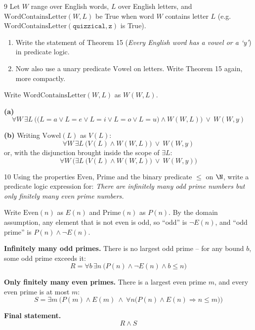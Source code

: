 \begin{exercise}{9}
    Let $W$ range over English words, $L$ over English letters, and
    $\mathrm{WordContainsLetter}(W,L)$ be True when word $W$ contains letter $L$
    (e.g.\ $\mathrm{WordContainsLetter}(\mathtt{quizzical},\mathtt z)$ is True).
    \begin{enumerate}[label=(\alph*)]
        \item Write the statement of Theorem 15 (\emph{Every English word has a
              vowel or a `y'}) in predicate logic.
        \item Now also use a unary predicate $\mathrm{Vowel}$ on letters. Write
              Theorem 15 again, more compactly.
    \end{enumerate}
\end{exercise}
\begin{solbox}

\begin{solution}
Write $\text{WordContainsLetter}(W,L)$ as $W(W,L)$.

\medskip
\noindent\textbf{(a)}
\[
\forall W\,\exists L\ \Big(\big(L=a\vee L=e\vee L=i\vee L=o\vee L=u\big)\wedge W(W,L)\Big)\ \vee\ W(W,y)
\]

\medskip
\noindent\textbf{(b)} Writing $\text{Vowel}(L)$ as $V(L)$:
\[
\forall W\,\exists L\ \Big(V(L)\wedge W(W,L)\Big)\ \vee\ W(W,y)
\]
or, with the disjunction brought inside the scope of $\exists L$:
\[
\forall W\ \Big(\exists L\ \big(V(L)\wedge W(W,L)\big)\ \vee\ W(W,y)\Big)
\]
\end{solution}
\end{solbox}

\begin{exercise}{10}
    Using the properties $\mathrm{Even}$, $\mathrm{Prime}$ and the binary
    predicate $\le$ on $\N$, write a predicate logic expression for:
    \emph{There are infinitely many odd prime numbers but only finitely many even
    prime numbers.}
\end{exercise}
\begin{solbox}

\begin{solution}
Write $\text{Even}(n)$ as $E(n)$ and $\text{Prime}(n)$ as $P(n)$. By
the domain assumption, any element that is not even is odd, so
``odd'' is $\neg E(n)$, and ``odd prime'' is $P(n)\wedge\neg E(n)$.

\medskip
\noindent\textbf{Infinitely many odd primes.} There is no largest
odd prime -- for any bound $b$, some odd prime exceeds it:
\[
R = \forall b\,\exists n\ \big(P(n)\wedge\neg E(n)\wedge b\leq n\big)
\]

\medskip
\noindent\textbf{Only finitely many even primes.} There is a
largest even prime $m$, and every even prime is at most $m$:
\[
S = \exists m\ \Big(P(m)\wedge E(m)\ \wedge\ \forall n\big(P(n)\wedge E(n)\Rightarrow n\leq m\big)\Big)
\]

\medskip
\noindent\textbf{Final statement.}
\[
R\wedge S
\]
\end{solution}
\end{solbox}

